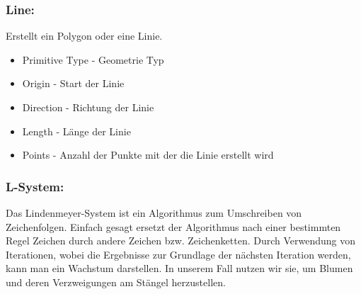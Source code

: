 \documentclass[paper=a4,fontsize=12pt,ngerman]{scrartcl}
\begin{document}
	\subsubsection*{Line:}
	Erstellt ein Polygon oder eine Linie.
	\begin{itemize}
		\item Primitive Type - Geometrie Typ  
		\item Origin - Start der Linie
		\item Direction - Richtung der Linie
		\item Length - Länge der Linie
		\item Points - Anzahl der Punkte mit der die Linie erstellt wird
	\end{itemize}
	\subsubsection*{L-System:}
	Das Lindenmeyer-System ist ein Algorithmus zum Umschreiben von Zeichenfolgen. Einfach gesagt ersetzt der Algorithmus nach einer bestimmten Regel Zeichen durch andere Zeichen bzw. Zeichenketten.
	Durch Verwendung von Iterationen, wobei die Ergebnisse zur Grundlage der nächsten Iteration werden, kann man ein Wachstum darstellen. In unserem Fall nutzen wir sie, um Blumen und deren Verzweigungen am Stängel herzustellen. 
\end{document}
